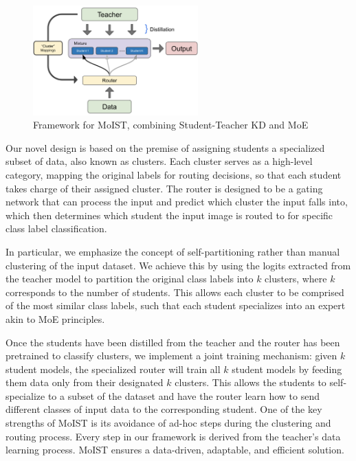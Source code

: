 \documentclass[conference]{IEEEtran}
\begin{document}
\begin{figure}[ht!] %
  \centering
  \includegraphics[width=2.5in]{figures/MoIST_framework.png}
  \caption{Framework for MoIST, combining Student-Teacher KD and MoE}
  \label{frameworkMoist}
\end{figure}


Our novel design is based on the premise of assigning students a specialized subset of data, also known as clusters. Each cluster serves as a high-level category, mapping the original labels for routing decisions, so that each student takes charge of their assigned cluster. The router is designed to be a gating network that can process the input and predict which cluster the input falls into, which then determines which student the input image is routed to for specific class label classification.

In particular, we emphasize the concept of self-partitioning rather than manual clustering of the input dataset. We achieve this by using the logits extracted from the teacher model to partition the original class labels into $k$ clusters, where $k$ corresponds to the number of students. This allows each cluster to be comprised of the most similar class labels, such that each student specializes into an expert akin to MoE principles.

Once the students have been distilled from the teacher and the router has been pretrained to classify clusters, we implement a joint training mechanism: given $k$ student models, the specialized router will train all $k$ student models by feeding them data only from their designated $k$ clusters. This allows the students to self-specialize to a subset of the dataset and have the router learn how to send different classes of input data to the corresponding student. One of the key strengths of MoIST is its avoidance of ad-hoc steps during the clustering and routing process. Every step in our framework is derived from the teacher's data learning process. MoIST ensures a data-driven, adaptable, and efficient solution.
\end{document}
